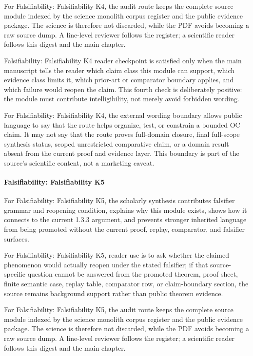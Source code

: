 For Falsifiability: Falsifiability K4, the audit route keeps the complete source module indexed by the science monolith corpus register and the public evidence package. The science is therefore not discarded, while the PDF avoids becoming a raw source dump. A line-level reviewer follows the register; a scientific reader follows this digest and the main chapter.


Falsifiability: Falsifiability K4 reader checkpoint is satisfied only when the main manuscript tells the reader which claim class this module can support, which evidence class limits it, which prior-art or comparator boundary applies, and which failure would reopen the claim. This fourth check is deliberately positive: the module must contribute intelligibility, not merely avoid forbidden wording.


For Falsifiability: Falsifiability K4, the external wording boundary allows public language to say that the route helps organize, test, or constrain a bounded OC claim. It may not say that the route proves full-domain closure, final full-scope synthesis status, scoped unrestricted comparative claim, or a domain result absent from the current proof and evidence layer. This boundary is part of the source's scientific content, not a marketing caveat.


\paragraph{Falsifiability: Falsifiability K5}

For Falsifiability: Falsifiability K5, the scholarly synthesis contributes falsifier grammar and reopening condition, explains why this module exists, shows how it connects to the current 1.3.3 argument, and prevents stronger inherited language from being promoted without the current proof, replay, comparator, and falsifier surfaces.


For Falsifiability: Falsifiability K5, reader use is to ask whether the claimed phenomenon would actually reopen under the stated falsifier; if that source-specific question cannot be answered from the promoted theorem, proof sheet, finite semantic case, replay table, comparator row, or claim-boundary section, the source remains background support rather than public theorem evidence.


For Falsifiability: Falsifiability K5, the audit route keeps the complete source module indexed by the science monolith corpus register and the public evidence package. The science is therefore not discarded, while the PDF avoids becoming a raw source dump. A line-level reviewer follows the register; a scientific reader follows this digest and the main chapter.


